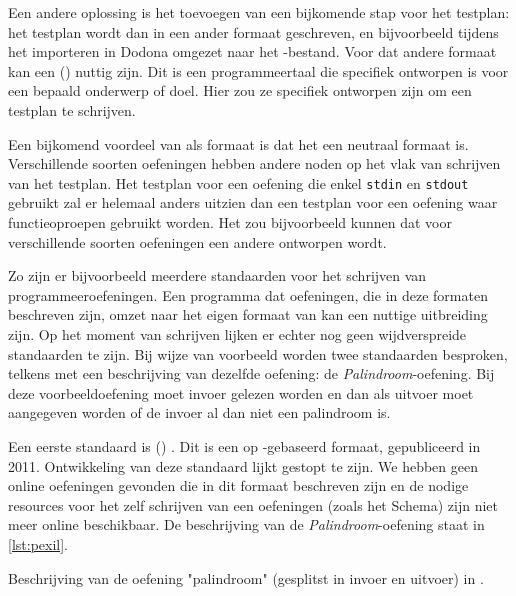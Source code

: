 Een andere oplossing is het toevoegen van een bijkomende stap voor het testplan: het testplan wordt dan in een ander formaat geschreven, en bijvoorbeeld tijdens het importeren in Dodona omgezet naar het -bestand.
Voor dat andere formaat kan een  () nuttig zijn.
Dit is een programmeertaal die specifiek ontworpen is voor een bepaald onderwerp of doel.
Hier zou ze specifiek ontworpen zijn om een testplan te schrijven.

Een bijkomend voordeel van  als formaat is dat het een neutraal formaat is.
Verschillende soorten oefeningen hebben andere noden op het vlak van schrijven van het testplan.
Het testplan voor een oefening die enkel \texttt{stdin} en \texttt{stdout} gebruikt zal er helemaal anders uitzien dan een testplan voor een oefening waar functieoproepen gebruikt worden.
Het zou bijvoorbeeld kunnen dat voor verschillende soorten oefeningen een andere  ontworpen wordt.

Zo zijn er bijvoorbeeld meerdere standaarden voor het schrijven van programmeeroefeningen.
Een programma dat oefeningen, die in deze formaten beschreven zijn, omzet naar het eigen formaat van \tested{} kan een nuttige uitbreiding zijn.
Op het moment van schrijven lijken er echter nog geen wijdverspreide standaarden te zijn.
Bij wijze van voorbeeld worden twee standaarden besproken, telkens met een beschrijving van dezelfde oefening: de \emph{Palindroom}-oefening.
Bij deze voorbeeldoefening moet invoer gelezen worden en dan als uitvoer moet aangegeven worden of de invoer al dan niet een palindroom is.

Een eerste standaard is  () \autocite{queiros2011pexil}.
Dit is een op -gebaseerd formaat, gepubliceerd in 2011.
Ontwikkeling van deze standaard lijkt gestopt te zijn.
We hebben geen online oefeningen gevonden die in dit formaat beschreven zijn en de nodige resources voor het zelf schrijven van een oefeningen (zoals het  Schema) zijn niet meer online beschikbaar.
De beschrijving van de \emph{Palindroom}-oefening staat in \cref{lst:pexil}.

\begin{listing}
    \caption{Beschrijving van de oefening "palindroom" (gesplitst in invoer en uitvoer) in .}
    \label{lst:pexil}
    \inputminted{xml}{code/pexil-in.xml}
    \inputminted{xml}{code/pexil-out.xml}
\end{listing}


